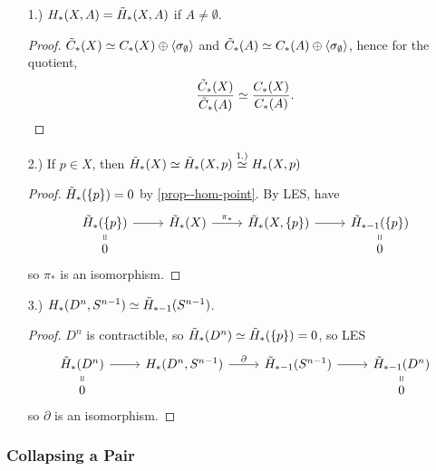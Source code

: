 \documentclass[a4paper,11pt]{article}
\begin{document}
				\begin{eg}
					\begin{enumerate}
						\item[1.)] $\hg{X,A}=\rhg{X,A}$ if $A\neq\emptyset$.\begin{proof}
							$\rcx{X}\simeq\cx{X}\oplus\an{\sigma_\emptyset}$ and $\rcx{A}\simeq\cx{A}\oplus\an{\sigma_\emptyset}$, hence for the quotient,
							\begin{equation*}
								\frac{\rcx{X}}{\rcx{A}}\simeq\frac{\cx{X}}{\cx{A}}.
							\end{equation*}
						\end{proof}
						\item[2.)] If $p\in X$, then $\rhg{X}\simeq\rhg{X,p}\overset{1.)}{\simeq}\hg{X,p}$\begin{proof}
							$\rhg{\{p\}}=0$ by \autoref{prop--hom-point}. By LES, have 
							\begin{equation*}
								\begin{tikzcd}[row sep=tiny]
									\rhg{\{p\}}\ar[d,equal]\ar[r]& \rhg{X}\ar[r,"\pi_\ast"]& \rhg{X,\{p\}}\ar[r]& \rhg[\ast-1]{\{p\}}\ar[d,equal]\\ 
									0 & & & 0
								\end{tikzcd}
							\end{equation*}
							so $\pi_\ast$ is an isomorphism.
						\end{proof}	
						\item[3.)] $\hg{D^n,S^{n-1}}\simeq\rhg[\ast-1]{S^{n-1}}$.\begin{proof}
							$D^n$ is contractible, so $\rhg{D^n}\simeq\rhg{\{p\}}=0$, so LES 
							\begin{equation*}
								\begin{tikzcd}[row sep=tiny]
									\rhg{D^n}\ar[d,equal]\ar[r]& \hg{D^n,S^{n-1}}\ar[r,"\partial"]& \rhg[\ast-1]{S^{n-1}}\ar[r]& \rhg[\ast-1]{D^n}\ar[d,equal]\\
									0 & & & 0
								\end{tikzcd}
							\end{equation*}
							so $\partial$ is an isomorphism.
						\end{proof}
					\end{enumerate}
				\end{eg}

			
			\subsubsection*{Collapsing a Pair}
				
\end{document}
